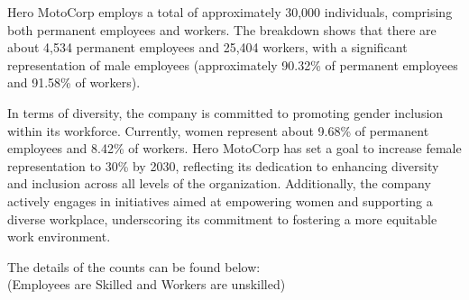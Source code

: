 Hero MotoCorp employs a total of approximately 30,000 individuals, comprising both permanent employees and workers\cite{hero_sreport}\cite{hero-rep}. The breakdown shows that there are about 4,534 permanent employees and 25,404 workers, with a significant representation of male employees (approximately 90.32\% of permanent employees and 91.58\% of workers).

In terms of diversity, the company is committed to promoting gender inclusion within its workforce. Currently, women represent about 9.68\% of permanent employees and 8.42\% of workers\cite{hero-rep}. Hero MotoCorp has set a goal to increase female representation to 30\% by 2030, reflecting its dedication to enhancing diversity and inclusion across all levels of the organization\cite{hero_sreport}. Additionally, the company actively engages in initiatives aimed at empowering women and supporting a diverse workplace, underscoring its commitment to fostering a more equitable work environment.

The details of the counts can be found below:\\
(Employees are Skilled and Workers are unskilled)
\begin{figure}[h]
\end{figure}
